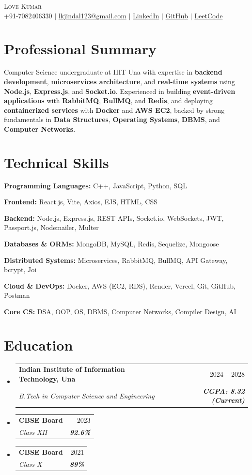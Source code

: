 ﻿\documentclass[letterpaper,10pt]{article}
\makeatletter
\newcommand{\resumeSubheading}[4]{
  \vspace{-6pt}\item
    \begin{tabular*}{\textwidth}[t]{l@{\extracolsep{\fill}}r}
      \textbf{#1} & \small #2 \\
      \textit{\small#3} & \textit{\small #4} \\
    \end{tabular*}\vspace{-10pt}
}
\newcommand{\resumeSubHeadingListStart}{\begin{itemize}[leftmargin=0.15in, label={}, itemsep=2pt]}
\newcommand{\resumeSubHeadingListEnd}{\end{itemize}\vspace{2pt}}
\makeatother
\begin{document}
\begin{center}
    {\Huge \scshape Love Kumar} \\ \vspace{2pt}
    \small +91-7082406330 $|$ 
    \href{mailto:lkjindal123@gmail.com}{lkjindal123@gmail.com} $|$ 
    \href{https://www.linkedin.com/in/love-kumar-jindal/}{LinkedIn} $|$ 
    \href{https://github.com/Lovejindal1}{GitHub} $|$ 
    \href{https://leetcode.com/u/JINDALSAHAAB}{LeetCode}
\end{center}

\section{Professional Summary}
\small{
Computer Science undergraduate at IIIT Una with expertise in \textbf{backend development}, \textbf{microservices architecture}, and \textbf{real-time systems} using \textbf{Node.js}, \textbf{Express.js}, and \textbf{Socket.io}. Experienced in building \textbf{event-driven applications} with \textbf{RabbitMQ}, \textbf{BullMQ}, and \textbf{Redis}, and deploying \textbf{containerized services} with \textbf{Docker} and \textbf{AWS EC2}, backed by strong fundamentals in \textbf{Data Structures}, \textbf{Operating Systems}, \textbf{DBMS}, and \textbf{Computer Networks}.}

\section{Technical Skills}
\small{
\textbf{Programming Languages:} C++, JavaScript, Python, SQL

\textbf{Frontend:} React.js, Vite, Axios, EJS, HTML, CSS

\textbf{Backend:} Node.js, Express.js, REST APIs, Socket.io, WebSockets, JWT, Passport.js, Nodemailer, Multer

\textbf{Databases \& ORMs:} MongoDB, MySQL, Redis, Sequelize, Mongoose

\textbf{Distributed Systems:} Microservices, RabbitMQ, BullMQ, API Gateway, bcrypt, Joi

\textbf{Cloud \& DevOps:} Docker, AWS (EC2, RDS), Render, Vercel, Git, GitHub, Postman

\textbf{Core CS:} DSA, OOP, OS, DBMS, Computer Networks, Compiler Design, AI
}

\section{Education}
\resumeSubHeadingListStart
\resumeSubheading
{Indian Institute of Information Technology, Una}{2024 -- 2028}
{B.Tech in Computer Science and Engineering}{\textbf{CGPA: 8.32 (Current)}}
\resumeSubheading
{CBSE Board}{2023}
{Class XII}{\textbf{92.6\%}}
\resumeSubheading
{CBSE Board}{2021}
{Class X}{\textbf{89\%}}
\resumeSubHeadingListEnd
\end{document}

